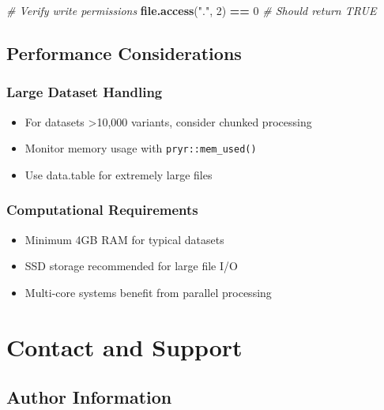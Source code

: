 \documentclass[
  11pt,
]{article}
\newenvironment{Shaded}{\begin{snugshade}}{\end{snugshade}}
\newcommand{\CommentTok}[1]{\textcolor[rgb]{0.56,0.35,0.01}{\textit{#1}}}
\newcommand{\DecValTok}[1]{\textcolor[rgb]{0.00,0.00,0.81}{#1}}
\newcommand{\FunctionTok}[1]{\textcolor[rgb]{0.13,0.29,0.53}{\textbf{#1}}}
\newcommand{\NormalTok}[1]{#1}
\newcommand{\SpecialCharTok}[1]{\textcolor[rgb]{0.81,0.36,0.00}{\textbf{#1}}}
\newcommand{\StringTok}[1]{\textcolor[rgb]{0.31,0.60,0.02}{#1}}
\providecommand{\tightlist}{%
  \setlength{\itemsep}{0pt}\setlength{\parskip}{0pt}}
\begin{document}
\begin{Shaded}
\begin{Highlighting}[]
\CommentTok{\# Verify write permissions}
\FunctionTok{file.access}\NormalTok{(}\StringTok{"."}\NormalTok{, }\DecValTok{2}\NormalTok{) }\SpecialCharTok{==} \DecValTok{0}  \CommentTok{\# Should return TRUE}
\end{Highlighting}
\end{Shaded}

\subsection{Performance
Considerations}\label{performance-considerations}

\subsubsection{Large Dataset Handling}\label{large-dataset-handling}

\begin{itemize}
\tightlist
\item
  For datasets \textgreater10,000 variants, consider chunked processing
\item
  Monitor memory usage with \texttt{pryr::mem\_used()}
\item
  Use data.table for extremely large files
\end{itemize}

\subsubsection{Computational
Requirements}\label{computational-requirements}

\begin{itemize}
\tightlist
\item
  Minimum 4GB RAM for typical datasets
\item
  SSD storage recommended for large file I/O
\item
  Multi-core systems benefit from parallel processing
\end{itemize}

\newpage

\section{Contact and Support}\label{contact-and-support}

\subsection{Author Information}\label{author-information}
\end{document}
